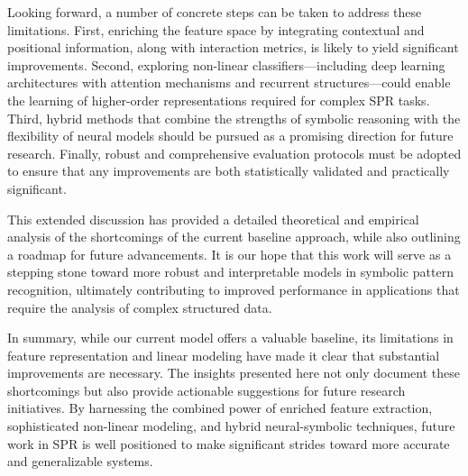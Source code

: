 \documentclass{article}
\begin{document}
Looking forward, a number of concrete steps can be taken to address these limitations. First, enriching the feature space by integrating contextual and positional information, along with interaction metrics, is likely to yield significant improvements. Second, exploring non-linear classifiers—including deep learning architectures with attention mechanisms and recurrent structures—could enable the learning of higher-order representations required for complex SPR tasks. Third, hybrid methods that combine the strengths of symbolic reasoning with the flexibility of neural models should be pursued as a promising direction for future research. Finally, robust and comprehensive evaluation protocols must be adopted to ensure that any improvements are both statistically validated and practically significant.

This extended discussion has provided a detailed theoretical and empirical analysis of the shortcomings of the current baseline approach, while also outlining a roadmap for future advancements. It is our hope that this work will serve as a stepping stone toward more robust and interpretable models in symbolic pattern recognition, ultimately contributing to improved performance in applications that require the analysis of complex structured data.

In summary, while our current model offers a valuable baseline, its limitations in feature representation and linear modeling have made it clear that substantial improvements are necessary. The insights presented here not only document these shortcomings but also provide actionable suggestions for future research initiatives. By harnessing the combined power of enriched feature extraction, sophisticated non-linear modeling, and hybrid neural-symbolic techniques, future work in SPR is well positioned to make significant strides toward more accurate and generalizable systems.
\end{document}
